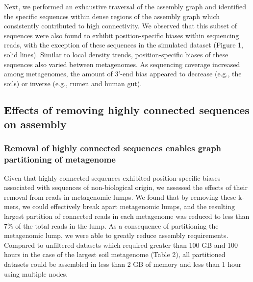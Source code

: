 \documentclass[10pt]{article}
\begin{document}
Next, we performed an exhaustive traversal of the assembly graph and
identified the specific sequences within dense regions of the assembly
graph which consistently contributed to high connectivity.  We
observed that this subset of sequences were also found to exhibit
position-specific biases within sequencing reads, with the exception
of these sequences in the simulated dataset (Figure 1, solid lines).
Similar to local density trends, position-specific biases of these
sequences also varied between metagenomes.  As sequencing coverage
increased among metagenomes, the amount of 3'-end bias appeared to
decrease (e.g., the soils) or inverse (e.g., rumen and human gut).

\subsection*{Effects of removing highly connected sequences on assembly}

\subsubsection*{Removal of highly connected sequences enables graph partitioning of metagenome}
Given that highly connected sequences exhibited position-specific
biases associated with sequences of non-biological origin, we assessed
the effects of their removal from reads in metagenomic lumps.  We
found that by removing these k-mers, we could effectively break apart
metagenomic lumps, and the resulting largest partition of connected
reads in each metagenome was reduced to less than 7\% of the total
reads in the lump.  As a consequence of partitioning the metagenomic
lump, we were able to greatly reduce assembly requirements.  Compared
to unfiltered datasets which required greater than 100 GB and 100
hours in the case of the largest soil metagenome (Table 2), all
partitioned datasets could be assembled in less than 2 GB of memory
and less than 1 hour using multiple nodes.
\end{document}

